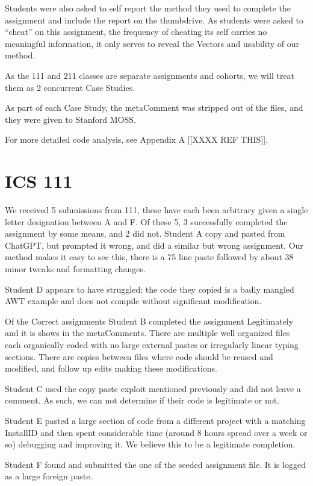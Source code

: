 \documentclass[12pt,final,thesis,actual]{uhthesis}
\newcommand{\installID}{InstallID\xspace}
\newcommand{\metaComment}{metaComment\xspace}
\begin{document}
Students were also asked to self report the method they used to complete the assignment and include the report on the thumbdrive.  As students were asked to ``cheat'' on this assignment, the frequency of cheating its self carries no meaningful information, it only serves to reveal the Vectors and usability of our method.

As the 111 and 211 classes are separate assignments and cohorts, we will treat them as 2 concurrent Case Studies. 

As part of each Case Study, the \metaComment was stripped out of the files, and they were given to Stanford MOSS.

For more detailed code analysis, see Appendix A [[XXXX REF THIS]].
\section{\textbf{ICS 111}}
We received 5 submissions from 111, these have each been arbitrary given a single letter designation between A and F.  Of these 5, 3 successfully completed the assignment by some means, and 2 did not.  Student A copy and pasted from ChatGPT, but prompted it wrong, and did a similar but wrong assignment.  Our method makes it easy to see this, there is a 75 line paste followed by about 38 minor tweaks and formatting changes.

Student D appears to have struggled: the code they copied is a badly mangled AWT example and does not compile without significant modification.

Of the Correct assignments Student B completed the assignment Legitimately and it is shows in the \metaComment{}s.  There are multiple well organized files each organically coded with no large external pastes or irregularly linear typing sections.  There are copies between files where code should be reused and modified, and follow up edits making these modifications.

Student C used the copy paste exploit mentioned previously and did not leave a comment.  As such, we can not determine if their code is legitimate or not.

Student E pasted a large section of code from a different project with a matching \installID and then spent considerable time (around 8 hours spread over a week or so) debugging and improving it.  We believe this to be a legitimate completion.

Student F found and submitted the one of the seeded assignment file.  It is logged as a large foreign paste.
\end{document}
